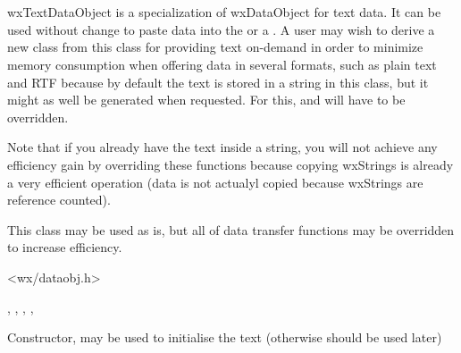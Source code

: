 \section{}\label{wxtextdataobject}

wxTextDataObject is a specialization of wxDataObject for text data. It can be
used without change to paste data into the  
or a . A user may wish to derive a new
class from this class for providing text on-demand in order to minimize memory
consumption when offering data in several formats, such as plain text and RTF
because by default the text is stored in a string in this class, but it might
as well be generated when requested. For this, 
 and 
 will have to be overridden.

Note that if you already have the text inside a string, you will not achieve
any efficiency gain by overriding these functions because copying wxStrings is
already a very efficient operation (data is not actualyl copied because
wxStrings are reference counted).


This class may be used as is, but all of data transfer functions may be
overridden to increase efficiency.




<wx/dataobj.h>


, 
, 
, 
, 


\label{wxtextdataobjectwxtextdataobject}


Constructor, may be used to initialise the text (otherwise 
 should be used later)

